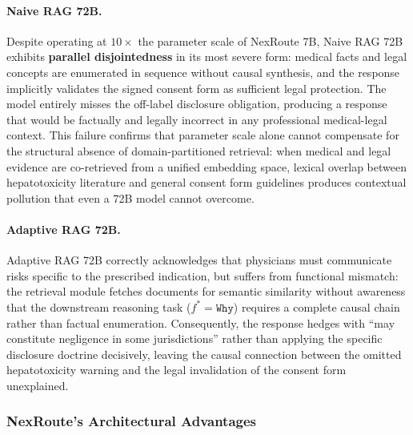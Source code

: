 \documentclass[a4paper,fleql]{cas-sc}
\begin{document}
\paragraph{Naive RAG 72B.}
Despite operating at $10\times$ the parameter scale of NexRoute 7B, Naive RAG
72B exhibits \textbf{parallel disjointedness} in its most severe form: medical
facts and legal concepts are enumerated in sequence without causal synthesis,
and the response implicitly validates the signed consent form as sufficient
legal protection. The model entirely misses the off-label disclosure
obligation, producing a response that would be factually and legally incorrect
in any professional medical-legal context. This failure confirms that parameter
scale alone cannot compensate for the structural absence of domain-partitioned
retrieval: when medical and legal evidence are co-retrieved from a unified
embedding space, lexical overlap between hepatotoxicity literature and general
consent form guidelines produces contextual pollution that even a 72B model
cannot overcome.

\paragraph{Adaptive RAG 72B.}
Adaptive RAG 72B correctly acknowledges that physicians must communicate
risks specific to the prescribed indication, but suffers from functional
mismatch: the retrieval module fetches documents for semantic similarity
without awareness that the downstream reasoning task ($f^* = \texttt{Why}$)
requires a complete causal chain rather than factual enumeration.
Consequently, the response hedges with ``may constitute negligence in some
jurisdictions'' rather than applying the specific disclosure doctrine
decisively, leaving the causal connection between the omitted hepatotoxicity
warning and the legal invalidation of the consent form unexplained.

\subsubsection{NexRoute's Architectural Advantages}
\label{sssec:nexroute-advantages}
\end{document}
